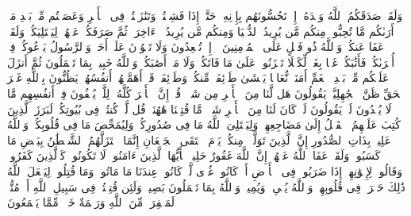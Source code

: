\startbuffer[\q:3:152]
وَلَقَدۡ صَدَقَكُمُ ٱللَّهُ وَعۡدَهُۥۤ إِذۡ تَحُسُّونَهُم بِإِذۡنِهِۦۖ حَتَّىٰۤ إِذَا فَشِلۡتُمۡ وَتَنَٰزَعۡتُمۡ فِی ٱلۡأَمۡرِ وَعَصَیۡتُم مِّنۢ بَعۡدِ مَاۤ أَرَىٰكُم مَّا تُحِبُّونَۚ مِنكُم مَّن یُرِیدُ ٱلدُّنۡیَا وَمِنكُم مَّن یُرِیدُ ٱلۡءَاخِرَةَۚ ثُمَّ صَرَفَكُمۡ عَنۡهُمۡ لِیَبۡتَلِیَكُمۡۖ وَلَقَدۡ عَفَا عَنكُمۡۗ وَٱللَّهُ ذُو فَضۡلٍ عَلَى ٱلۡمُؤۡمِنِینَ%
\stopbuffer%
\startbuffer[\q:3:153]
۞ إِذۡ تُصۡعِدُونَ وَلَا تَلۡوُۥنَ عَلَىٰۤ أَحَدࣲ وَٱلرَّسُولُ یَدۡعُوكُمۡ فِیۤ أُخۡرَىٰكُمۡ فَأَثَٰبَكُمۡ غَمَّۢا بِغَمࣲّ لِّكَیۡلَا تَحۡزَنُوا۟ عَلَىٰ مَا فَاتَكُمۡ وَلَا مَاۤ أَصَٰبَكُمۡۗ وَٱللَّهُ خَبِیرُۢ بِمَا تَعۡمَلُونَ%
\stopbuffer%
\startbuffer[\q:3:154]
ثُمَّ أَنزَلَ عَلَیۡكُم مِّنۢ بَعۡدِ ٱلۡغَمِّ أَمَنَةࣰ نُّعَاسࣰا یَغۡشَىٰ طَاۤئِفَةࣰ مِّنكُمۡۖ وَطَاۤئِفَةࣱ قَدۡ أَهَمَّتۡهُمۡ أَنفُسُهُمۡ یَظُنُّونَ بِٱللَّهِ غَیۡرَ ٱلۡحَقِّ ظَنَّ ٱلۡجَٰهِلِیَّةِۖ یَقُولُونَ هَل لَّنَا مِنَ ٱلۡأَمۡرِ مِن شَیۡءࣲۗ قُلۡ إِنَّ ٱلۡأَمۡرَ كُلَّهُۥ لِلَّهِۗ یُخۡفُونَ فِیۤ أَنفُسِهِم مَّا لَا یُبۡدُونَ لَكَۖ یَقُولُونَ لَوۡ كَانَ لَنَا مِنَ ٱلۡأَمۡرِ شَیۡءࣱ مَّا قُتِلۡنَا هَٰهُنَاۗ قُل لَّوۡ كُنتُمۡ فِی بُیُوتِكُمۡ لَبَرَزَ ٱلَّذِینَ كُتِبَ عَلَیۡهِمُ ٱلۡقَتۡلُ إِلَىٰ مَضَاجِعِهِمۡۖ وَلِیَبۡتَلِیَ ٱللَّهُ مَا فِی صُدُورِكُمۡ وَلِیُمَحِّصَ مَا فِی قُلُوبِكُمۡۚ وَٱللَّهُ عَلِیمُۢ بِذَاتِ ٱلصُّدُورِ%
\stopbuffer%
\startbuffer[\q:3:155]
إِنَّ ٱلَّذِینَ تَوَلَّوۡا۟ مِنكُمۡ یَوۡمَ ٱلۡتَقَى ٱلۡجَمۡعَانِ إِنَّمَا ٱسۡتَزَلَّهُمُ ٱلشَّیۡطَٰنُ بِبَعۡضِ مَا كَسَبُوا۟ۖ وَلَقَدۡ عَفَا ٱللَّهُ عَنۡهُمۡۗ إِنَّ ٱللَّهَ غَفُورٌ حَلِیمࣱ%
\stopbuffer%
\startbuffer[\q:3:156]
یَٰۤأَیُّهَا ٱلَّذِینَ ءَامَنُوا۟ لَا تَكُونُوا۟ كَٱلَّذِینَ كَفَرُوا۟ وَقَالُوا۟ لِإِخۡوَٰنِهِمۡ إِذَا ضَرَبُوا۟ فِی ٱلۡأَرۡضِ أَوۡ كَانُوا۟ غُزࣰّى لَّوۡ كَانُوا۟ عِندَنَا مَا مَاتُوا۟ وَمَا قُتِلُوا۟ لِیَجۡعَلَ ٱللَّهُ ذَٰلِكَ حَسۡرَةࣰ فِی قُلُوبِهِمۡۗ وَٱللَّهُ یُحۡیِۦ وَیُمِیتُۗ وَٱللَّهُ بِمَا تَعۡمَلُونَ بَصِیرࣱ%
\stopbuffer%
\startbuffer[\q:3:157]
وَلَئِن قُتِلۡتُمۡ فِی سَبِیلِ ٱللَّهِ أَوۡ مُتُّمۡ لَمَغۡفِرَةࣱ مِّنَ ٱللَّهِ وَرَحۡمَةٌ خَیۡرࣱ مِّمَّا یَجۡمَعُونَ%
\stopbuffer%
